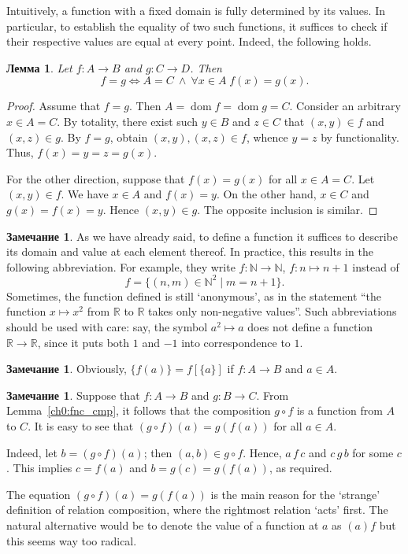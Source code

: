 \documentclass[12pt,notitlepage]{article}
\theoremstyle{plain}
\newtheorem{lemma}[thm]{Лемма}
\theoremstyle{definition}
\newtheorem{rem}[thm]{Замечание}
\theoremstyle{plain}
\newcommand{\N}{\mathbb{N}}
\newcommand{\R}{\mathbb{R}}
\newcommand{\dom}{\mathop{\mathrm{dom}}}
\newcommand{\1}{\mathbf{1}}
\newcommand{\0}{\mathbf{0}}
\newcommand{\mcomm}[1]{}
\begin{document}
Intuitively, a function with a fixed domain is fully determined by its values. In particular, to establish the equality of two such functions, it suffices to check if their respective values are equal at every point. Indeed, the following holds.
\begin{lemma}\label{ch0:tot_fnc_cmp}
	Let $f\colon A \to B$ and $g\colon C \to D$. Then
	$$f = g \iff A = C\ \wedge\ \forall x \in A\; f(x) = g(x).$$
\end{lemma}
\begin{proof}
	Assume that $f = g$. Then $A = \dom f = \dom g = C$. Consider an arbitrary $x \in A = C$. By totality, there exist such $y \in B$ and $z \in C$ that $(x,y) \in f$ and $(x,z) \in g$. By $f = g$, obtain $(x, y), (x, z) \in f$, whence $y = z$ by functionality. Thus, $f(x) = y = z = g(x)$.
	
	For the other direction, suppose that $f(x) = g(x)$ for all $x \in A = C$. Let $(x,y) \in f$. We have $x \in A$ and $f(x) = y$. On the other hand, $x \in C$ and $g(x) = f(x) = y$. Hence $(x,y) \in g$. The opposite inclusion is similar.
\end{proof}

\begin{rem}
	As we have already said, to define a function it suffices to describe its domain and value at each element thereof. In practice, this results in the following abbreviation. For example, they write $f\colon \N \to \N$, $f\colon n \mapsto n + 1$ instead of
	$$f = \{(n,m) \in \N^2 \mid m = n + 1 \}.$$
	Sometimes, the function defined is still `anonymous', as in the statement ``the function $x \mapsto x^2$ from $\R$ to $\R$ takes only non-negative values''. Such abbreviations should be used with care: say, the symbol  $a^2 \mapsto a$ does not define a function $\R \to \R$, since it puts both $1$ and $-1$ into correspondence to $1$. 
\end{rem}

\begin{rem}
	Obviously,  $\{f(a)\} = f[\{a\}]$ if $f\colon A \to B$ and $a \in A$.
\end{rem}

\mcomm{The students may have already defined composition of functions in their calculus course. So, it is important to show them the identity of `our' composition (when restricted to functions) with that of calculus.}
\begin{rem}
	Suppose that $f\colon A \to B$ and $g\colon B \to C$. From Lemma~\ref{ch0:fnc_cmp}, it follows that the composition $g \circ f$ is a function from $A$ to $C$. It is easy to see that $(g\circ f)(a) = g(f(a))$ for all $a \in A$.
	
	Indeed, let $b = (g \circ f)(a)$; then $(a, b) \in g \circ f$. Hence, $a\, f\, c$ and $c\, g\, b$ for some $c$. This implies $c = f(a)$ and $b = g(c) = g (f(a))$, as required.
	
	The equation $(g\circ f)(a) = g(f(a))$ is the main reason for the `strange' definition of relation composition, where the rightmost relation `acts' first. The natural alternative would be to denote the value of a function at $a$ as $(a)f$ but this seems way too radical.
\end{rem}
\end{document}
